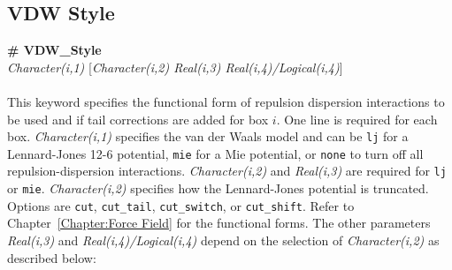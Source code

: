 \subsection{VDW Style}\label{sec:VDW_Style}
{\bf \# VDW\_Style} \\
{\it Character(i,1)} [{\it Character(i,2) Real(i,3) Real(i,4)/Logical(i,4)}] \\ \\
%
This keyword specifies the functional form of repulsion dispersion
interactions to be used and if tail corrections are added for box $i$. 
One line is required for each box. 
{\it Character(i,1)} specifies the van der Waals model and can be 
\texttt{lj} for a Lennard-Jones 12-6 potential,
\texttt{mie} for a Mie potential, 
or \texttt{none} to turn off all repulsion-dispersion interactions. 
{\it Character(i,2)} and {\it Real(i,3)} are required for \texttt{lj} or \texttt{mie}. 
{\it Character(i,2)} specifies how the Lennard-Jones potential is truncated.
Options are \texttt{cut}, \texttt{cut\_tail}, \texttt{cut\_switch}, or \texttt{cut\_shift}. 
Refer to Chapter~\ref{Chapter:Force Field} for the functional forms.
The other parameters \emph{Real(i,3)} and \emph{Real(i,4)/Logical(i,4)} depend on the
selection of \emph{Character(i,2)} as described below:
%
